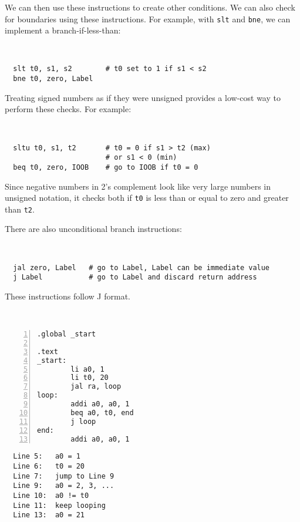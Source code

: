 We can then use these instructions to create other conditions. We can also check for boundaries using these instructions. For example, with \verb|slt| and \verb|bne|, we can implement a branch-if-less-than:
\begin{codeBlock}~
\begin{verbatim}
  slt t0, s1, s2        # t0 set to 1 if s1 < s2
  bne t0, zero, Label
\end{verbatim}
\end{codeBlock}

Treating signed numbers as if they were unsigned provides a low-cost way to perform these checks. For example:
\begin{codeBlock}~
\begin{verbatim}
  sltu t0, s1, t2       # t0 = 0 if s1 > t2 (max)
                        # or s1 < 0 (min)
  beq t0, zero, IOOB    # go to IOOB if t0 = 0
\end{verbatim}
\end{codeBlock}

Since negative numbers in 2's complement look like very large numbers in unsigned notation, it checks both if \verb|t0| is less than or equal to zero and greater than \verb|t2|. 

There are also unconditional branch instructions:
\begin{codeBlock}~
\begin{verbatim}
  jal zero, Label   # go to Label, Label can be immediate value
  j Label           # go to Label and discard return address
\end{verbatim}
\end{codeBlock}

These instructions follow J format. 

\begin{eg}~

\begin{minipage}{0.5\textwidth}
\begin{Verbatim}[numbers=left,xleftmargin=5mm]
.global _start

.text
_start:
        li a0, 1
        li t0, 20
        jal ra, loop 
loop:
        addi a0, a0, 1
        beq a0, t0, end 
        j loop
end:    
        addi a0, a0, 1
\end{Verbatim}
\end{minipage}
\begin{minipage}{0.5\textwidth}
\color{red}
\begin{verbatim}
  Line 5:   a0 = 1
  Line 6:   t0 = 20
  Line 7:   jump to Line 9
  Line 9:   a0 = 2, 3, ...
  Line 10:  a0 != t0
  Line 11:  keep looping
  Line 13:  a0 = 21
\end{verbatim}
\end{minipage}
\end{eg}


